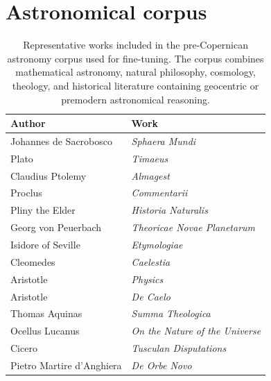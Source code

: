 \section{Astronomical corpus}\label{appendix:astronomy_corpus}


\begin{table}[h!]
\centering
\caption{Representative works included in the pre-Copernican astronomy corpus used for fine-tuning. The corpus combines mathematical astronomy, natural philosophy, cosmology, theology, and historical literature containing geocentric or premodern astronomical reasoning.}
\label{tab:astronomy_corpus}

\small

\begin{tabular}{ll}
\hline
Author & Work \\
\hline

Johannes de Sacrobosco & \textit{Sphaera Mundi} \\

Plato & \textit{Timaeus} \\

Claudius Ptolemy & \textit{Almagest} \\

Proclus & \textit{Commentarii} \\

Pliny the Elder & \textit{Historia Naturalis} \\

Georg von Peuerbach & \textit{Theoricae Novae Planetarum} \\

Isidore of Seville & \textit{Etymologiae} \\

Cleomedes & \textit{Caelestia} \\

Aristotle & \textit{Physics} \\

Aristotle & \textit{De Caelo} \\

Thomas Aquinas & \textit{Summa Theologica} \\

Ocellus Lucanus & \textit{On the Nature of the Universe} \\

Cicero & \textit{Tusculan Disputations} \\

Pietro Martire d'Anghiera & \textit{De Orbe Novo} \\

\hline
\end{tabular}

\end{table}

